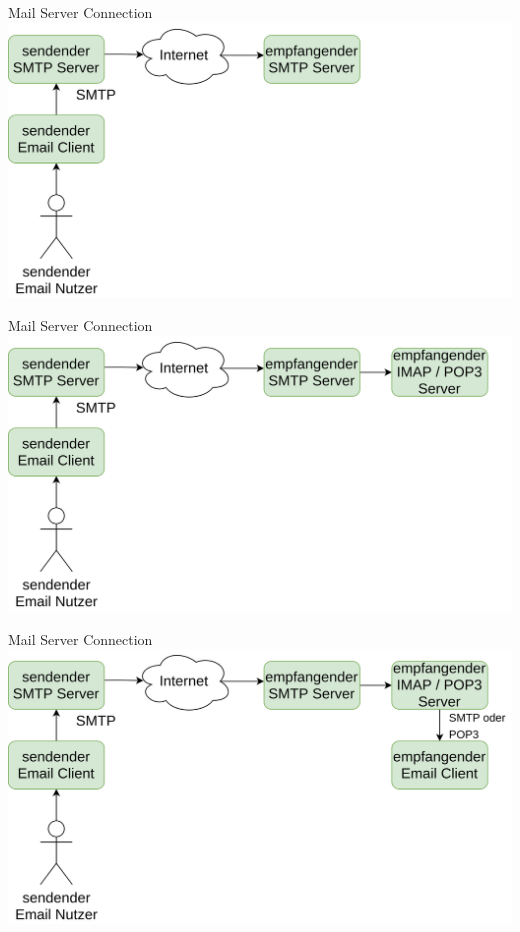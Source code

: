 \documentclass[aspectratio=169]{beamer}
\begin{document}
\begin{frame}[plain]{Mail Server Connection}
    \centering
    \includegraphics[height=.8\textheight]{media/mail-diagram-05.png}
\end{frame}

\begin{frame}[plain]{Mail Server Connection}
    \centering
    \includegraphics[height=.8\textheight]{media/mail-diagram-06.png}
\end{frame}

\begin{frame}[plain]{Mail Server Connection}
    \centering
    \includegraphics[height=.8\textheight]{media/mail-diagram-07.png}
\end{frame}
\end{document}

